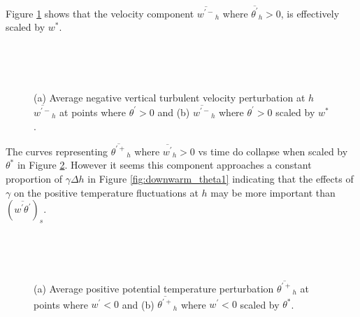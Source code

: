 Figure \ref{fig:downwarm_wvel} shows that the velocity component $\overline{w^{'-}}_{h}$  where $ \overline{\theta^{'}}_{h}>0$, is effectively scaled by $w^{*}$.\\   

\begin{figure}[htbp]
\begin{minipage}[b]{0.5\linewidth}
        \\
        \end{minipage}             
\quad
\begin{minipage}[b]{0.5\linewidth}
        \\       
       \end{minipage}
        \caption[Downward turbulent velocity perturbation at $h$]{(a) Average negative vertical turbulent velocity perturbation at $h$ $\overline{w^{\prime-}}_{h}$ at points where $\theta^{\prime}>0$ and (b) $\overline{w^{\prime-}}_{h}$ where $\theta^{\prime}>0$ scaled by $w^{*}$.}
        \label{fig:downwarm_wvel}
\end{figure}

The curves representing $\overline{\theta^{'+}}_{h}$ where $\overline{w^{'}}_{h}>0$ vs time do collapse when scaled by $\theta^{*}$ in Figure \ref{fig:downwarm_theta}.  However it seems this component approaches a constant proportion of $\gamma \Delta h$ in Figure \ref{fig:downwarm_theta1} indicating that the effects of $\gamma$ on the positive temperature fluctuations at $h$ may be more important than $(\overline{w^{'}\theta^{'}})_{s}$.\\ 

\begin{figure}[htbp]
\begin{minipage}[b]{0.5\linewidth}
        \\
        \end{minipage}             
\quad
\begin{minipage}[b]{0.5\linewidth}
        \\      
       \end{minipage}
        \caption[Positive potential temperature perturbation at $h$ (i)]{(a) Average positive potential temperature perturbation $\overline{\theta^{\prime+}}_{h}$ at points where $w^{\prime}<0$ and (b) $\overline{\theta^{\prime+}}_{h}$ where $w^{\prime}<0$ scaled by $\theta^{*}$.}
        \label{fig:downwarm_theta}
\end{figure}

